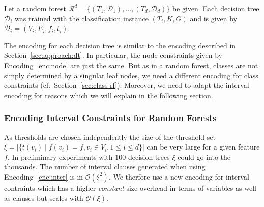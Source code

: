 \documentclass[a4paper, USenglish, cleveref, autoref, thm-restate]{lipics-v2021}
\theoremstyle{definition}
\begin{document}
Let a random forest $\mathcal{R}^d = \{ (T_1, \mathcal{D}_1), \dots, (T_d, \mathcal{D}_d) \}$ be given. 
Each decision tree $\mathcal{D}_i$ was trained with the classification instance $(T_i, K, G)$ and is given by $\mathcal{D}_i=(V_i, E_i, f_i, t_i)$. 

The encoding for each decision tree is similar to the encoding described in Section~\ref{sec:approach:dt}. 
In particular, the node constraints given by Encoding~\ref{enc:node} are just the same. 
But as in a random forest, classes are not simply determined by a singular leaf nodes, we need a different encoding for class constraints (cf.~Section~\ref{sec:class-rf}). 
Moreover, we need to adapt the interval encoding for reasons which we will explain in the following section. 


\subsubsection{Encoding Interval Constraints for Random Forests}
\label{sec:interval-rf}

As thresholds are chosen independently the size of the threshold set $\xi=|\{ t(v_i) \mid f(v_i) = f, v_i \in V_i, 1 \leq i \leq d \}|$ can be very large for a given feature $f$. 
In preliminary experiments with $100$ decision trees $\xi$ could go into the thousands. 
The number of interval clauses generated when using Encoding~\ref{enc:inter} is in $\mathcal{O}(\xi^2)$. 
We therfore use a new encoding for interval contraints which has a higher \emph{constant} size overhead in terms of variables as well as clauses but scales with $\mathcal{O}(\xi)$. 
\end{document}
